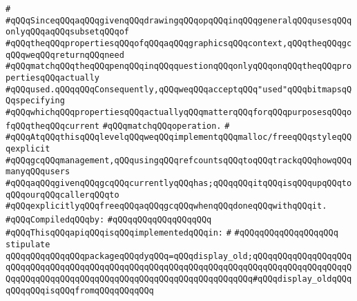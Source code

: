 \verb|#|\newline
\verb|#qQQqSinceqQQqaqQQqgivenqQQqdrawingqQQqopqQQqinqQQqgeneralqQQqusesqQQqonlyqQQqaqQQqsubsetqQQqof|\newline
\verb|#qQQqtheqQQqpropertiesqQQqofqQQqaqQQqgraphicsqQQqcontext,qQQqtheqQQqgcqQQqweqQQqreturnqQQqneed|\newline
\verb|#qQQqmatchqQQqtheqQQqpenqQQqinqQQqquestionqQQqonlyqQQqonqQQqtheqQQqpropertiesqQQqactually|\newline
\verb|#qQQqused.qQQqqQQqConsequently,qQQqweqQQqacceptqQQq"used"qQQqbitmapsqQQqspecifying|\newline
\verb|#qQQqwhichqQQqpropertiesqQQqactuallyqQQqmatterqQQqforqQQqpurposesqQQqofqQQqtheqQQqcurrent|\newline
\verb|#qQQqmatchqQQqoperation.|\newline
\verb|#|\newline
\verb|#qQQqAtqQQqthisqQQqlevelqQQqweqQQqimplementqQQqmalloc/freeqQQqstyleqQQqexplicit|\newline
\verb|#qQQqgcqQQqmanagement,qQQqusingqQQqrefcountsqQQqtoqQQqtrackqQQqhowqQQqmanyqQQqusers|\newline
\verb|#qQQqaqQQqgivenqQQqgcqQQqcurrentlyqQQqhas;qQQqqQQqitqQQqisqQQqupqQQqtoqQQqourqQQqcallerqQQqto|\newline
\verb|#qQQqexplicitlyqQQqfreeqQQqaqQQqgcqQQqwhenqQQqdoneqQQqwithqQQqit.|\newline
\newline
\verb|#qQQqCompiledqQQqby:|\newline
\verb|#qQQqqQQqqQQqqQQqqQQq|\newline
\newline
\verb|#qQQqThisqQQqapiqQQqisqQQqimplementedqQQqin:|\newline
\verb|#|\newline
\verb|#qQQqqQQqqQQqqQQqqQQq|\newline
\newline
\verb|stipulate|\newline
\verb|qQQqqQQqqQQqqQQqpackageqQQqdyqQQq=qQQqdisplay_old;qQQqqQQqqQQqqQQqqQQqqQQqqQQqqQQqqQQqqQQqqQQqqQQqqQQqqQQqqQQqqQQqqQQqqQQqqQQqqQQqqQQqqQQqqQQqqQQqqQQqqQQqqQQqqQQqqQQqqQQqqQQqqQQqqQQqqQQqqQQq#qQQqdisplay_oldqQQqqQQqqQQqisqQQqfromqQQqqQQqqQQq|\newline
